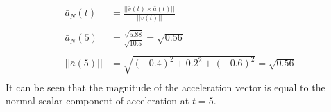 \documentclass[a4paper,11pt]{article}
\begin{document}
\begin{enumerate}
\begin{enumerate}
        \begin{align*}
            \bar{a}_N(t)&= \frac{|| \bar{v}(t) \times \bar{a}(t) ||}{|| \bar{v}(t) ||}\\\\
            \bar{a}_N(5) &= \frac{\sqrt{5.88}}{\sqrt{10.5}} = \sqrt{0.56}\\\\
            ||\bar{a}(5)|| &= \sqrt{(-0.4)^2 + 0.2^2 + (- 0.6)^2} = \sqrt{0.56}\\
        \end{align*}
        It can be seen that the magnitude of the acceleration vector is equal to the normal scalar component of acceleration at $t=5$.
        
    \end{enumerate}


\end{enumerate}
\end{document}
